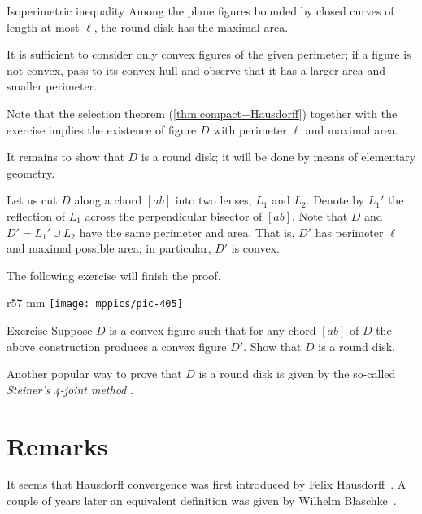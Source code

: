 \begin{thm}{Isoperimetric inequality}\label{thm:isoperimetric}
Among the plane figures bounded by closed curves of length at most $\ell$, the round disk has the maximal area.
\end{thm}

It is sufficient to consider only convex figures of the given perimeter; if a figure is not convex, pass to its convex hull and observe that it has a larger area and smaller perimeter.


Note that the selection theorem (\ref{thm:compact+Hausdorff}) together with the exercise implies the existence of figure $D$ with perimeter $\ell$ and maximal area.

It remains to show that $D$ is a round disk;
it will be done by means of elementary geometry.

Let us cut $D$ along a chord $[ab]$ into two lenses, $L_1$ and $L_2$.
Denote by $L_1'$ the reflection of $L_1$ across the perpendicular bisector of $[ab]$.
Note that $D$ and $D'=L_1'\cup L_2$ have the same perimeter and area.
That is, $D'$ has perimeter $\ell$ and maximal possible area;
in particular, $D'$ is convex.

The following exercise will finish the proof.
\qeds

{

\begin{wrapfigure}{r}{57 mm}
\vskip-0mm
\centering
\texttt{[image: mppics/pic-405]}
\end{wrapfigure}

\begin{thm}{Exercise}\label{ex:round-disc}
Suppose $D$ is a convex figure such that for any chord $[ab]$ of $D$ the above construction produces a convex figure $D'$.
Show that $D$ is a round disk.
\end{thm}

}

Another popular way to prove that $D$ is a round disk is given by the so-called \textit{Steiner's 4-joint method} \cite{blaschke}.



\section{Remarks}\label{sec:H-variation}

It seems that Hausdorff convergence was first introduced by Felix Hausdorff~\cite{hausdorff}.
A couple of years later an equivalent definition was given by Wilhelm Blaschke~\cite{blaschke}.

